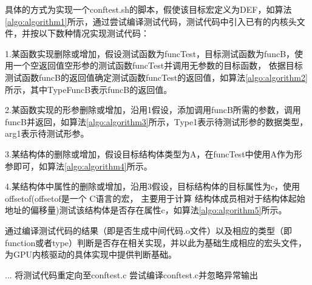 具体的方式为实现一个conftest.sh的脚本，假使该目标宏定义为DEF，如算法\ref{algo:algorithm1}所示，通过尝试编译测试代码，测试代码中引入已有的内核头文件，并按以下数种情况实现测试代码：

1.某函数实现删除或增加，假设测试函数为funcTest，目标测试函数为funcB，使用一个空返回值空形参的测试函数funcTest并调用无参数的目标函数，
依据目标测试函数funcB的返回值确定测试函数funcTest的返回值，如算法\ref{algo:algorithm2}所示，其中TypeFuncB表示funcB的返回值。

2.某函数实现的形参删除或增加，沿用1假设，添加调用funcB所需的参数，调用funcB并返回，如算法\ref{algo:algorithm3}所示，Type1表示待测试形参的数据类型，arg1表示待测试形参。

3.某结构体的删除或增加，假设目标结构体类型为A，在funcTest中使用A作为形参即可，如算法\ref{algo:algorithm4}所示。

4.某结构体中属性的删除或增加，沿用3假设，目标结构体的目标属性为c，使用offsetof(offsetof是一个 C语言的宏，
主要用于计算 结构体成员相对于结构体起始地址的偏移量)测试该结构体是否存在属性c，如算法\ref{algo:algorithm5}所示。

通过编译测试代码的结果（即是否生成中间代码.o文件）以及相应的类型（即function或者type）判断是否存在相关实现，并以此为基础生成相应的宏头文件，为GPU内核驱动的具体实现中提供判断基础。

\begin{algorithm}[h]
  \SetAlgoLined
  ...\;
  将测试代码重定向至conftest.c\;
  尝试编译conftest.c并忽略异常输出\;
  \caption{编译检查测试函数}
  \label{algo:algorithm1}
\end{algorithm}

\begin{minipage}{0.45\textwidth}
  \begin{algorithm}[H]
    \SetAlgoLined
    \caption{测试代码示例1}
    \label{algo:algorithm2}
  \end{algorithm}
\end{minipage}
\hfill
\begin{minipage}{0.45\textwidth}
  \begin{algorithm}[H]
    \SetAlgoLined
    \caption{测试代码示例2}
    \label{algo:algorithm3}
  \end{algorithm}
\end{minipage}


